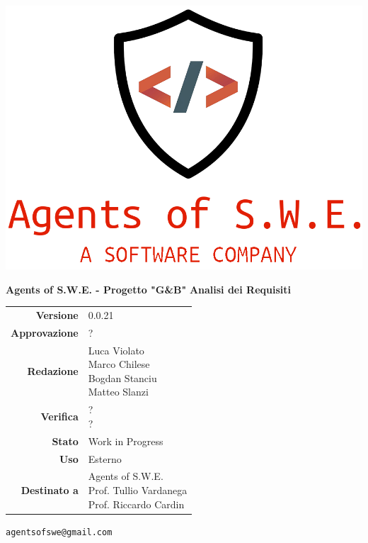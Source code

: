 


\begin{titlepage}
\thispagestyle{empty}

\begin{center}

\includegraphics[scale=0.3]{./images/logo.png} 

\large \textbf{Agents of S.W.E. - Progetto "G\&B"}
\vfill
\Huge \textbf{Analisi dei Requisiti}
\vfill
\large
\renewcommand{\arraystretch}{1.3}
\begin{tabular}{r|l}
\textbf{Versione} & 0.0.21\\
\textbf{Approvazione} & ?\\
\textbf{Redazione} & \parbox[t]{5cm}{Luca Violato\\Marco Chilese\\Bogdan Stanciu\\Matteo Slanzi}\\
\textbf{Verifica} & \parbox[t]{5cm}{?\\?}\\
\textbf{Stato} & Work in Progress\\
\textbf{Uso} & Esterno\\
\textbf{Destinato a} & \parbox[t]{5cm}{Agents of S.W.E. \\Prof. Tullio Vardanega\\Prof. Riccardo Cardin}
\end{tabular}
\vfill
\small
\texttt{agentsofswe@gmail.com}
\end{center}
\end{titlepage}


